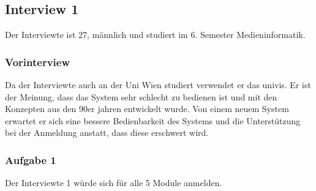 \documentclass[a4paper,10pt]{scrartcl}
\begin{document}
\subsection*{Interview 1}

Der Interviewte ist 27, männlich und studiert im 6. Semester Medieninformatik.

\subsubsection*{Vorinterview}

Da der Interviewte auch an der Uni Wien studiert verwendet er das univis. Er ist der Meinung, dass das System sehr schlecht zu bedienen ist und mit den Konzepten
aus den 90er jahren entwickelt wurde. Von einem neuem System erwartet er sich eine bessere Bedienbarkeit des Systems und die Unterstützung bei der Anmeldung
anstatt, dass diese erschwert wird.

\subsubsection*{Aufgabe 1}

Der Interviewte 1 würde sich für alle 5 Module anmelden.
\end{document}
